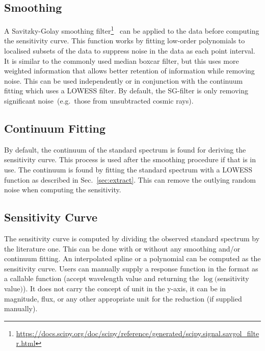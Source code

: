 \documentclass[fleqn,usenatbib]{mnras}
\begin{document}
\subsection*{Smoothing}
A Savitzky-Golay smoothing
filter\footnote{\url{https://docs.scipy.org/doc/scipy/reference/generated/scipy.signal.savgol_filter.html}}~\citep[hereafter, SG-filter]{1964AnaCh..36.1627S}
can be applied to the data before computing the sensitivity curve.
This function works by fitting low-order polynomials to localised
subsets of the data to suppress noise in the data as each point
interval. It is similar to the commonly used median boxcar filter,
but this uses more weighted information that allows better
retention of information while removing noise. This can be
used independently or in conjunction with the continuum fitting which
uses a LOWESS filter. By default, the SG-filter is only removing
significant noise~(e.g.\ those from unsubtracted cosmic rays).

\subsection*{Continuum Fitting}
By default, the continuum of the standard spectrum is found for
deriving the sensitivity curve. This process is used after the
smoothing procedure if that is in use. The continuum is found by
fitting the standard spectrum with a LOWESS function as described in
Sec.~\ref{sec:extract}. This can remove the outlying random noise
when computing the sensitivity.

\subsection*{Sensitivity Curve}
The sensitivity curve is computed by dividing the observed standard
spectrum by the literature one. This can be done with or without any
smoothing and/or continuum fitting. An interpolated spline or a polynomial
can be computed as the sensitivity curve. Users can manually supply a
response function in the format as a callable function (accept wavelength
value and returning the $\log($sensitivity value$)$). It does not carry
the concept of unit in the y-axis, it can be in magnitude, flux, or any
other appropriate unit for the reduction (if supplied manually).
\end{document}
